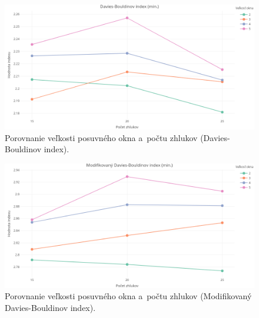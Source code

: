 \documentclass[a4paper,twoside,slovak,12pt,appendix]{article}
\begin{document}
\begin{appendices}
\begin{figure}[htbp]
\end{figure}
\begin{figure}[htbp]
  \centering
  \includegraphics[width=\textwidth]{cvi/dtw_basic_workdays_sparse/201902271850-DB-dtw_basic_workdays_sparse.png}
  \caption{Porovnanie veľkosti posuvného okna a~počtu zhlukov (Davies-Bouldinov index).}
\end{figure}
\begin{figure}[htbp]
  \centering
  \includegraphics[width=\textwidth]{cvi/dtw_basic_workdays_sparse/201902271850-DBstar-dtw_basic_workdays_sparse.png}
  \caption{Porovnanie veľkosti posuvného okna a~počtu zhlukov (Modifikovaný Davies-Bouldinov index).}
\end{figure}


\end{appendices}
\end{document}
